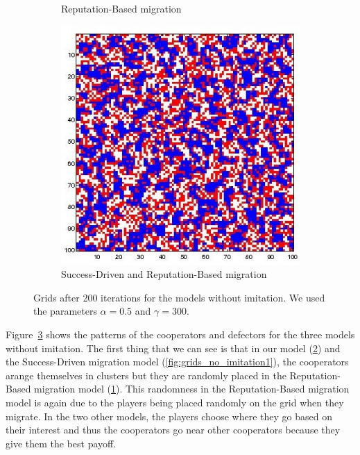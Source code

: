 \documentclass[11pt]{article}
\begin{document}
\begin{figure}[h]
\begin{subfigure}[t]{0.3\textwidth}
	\caption{Reputation-Based migration}
	\label{fig:grids_no_imitation4}
    	\end{subfigure}
	\begin{subfigure}[t]{0.3\textwidth}
        \includegraphics[width=\textwidth]{../../other/grids/m5-t200-a5-g300.jpg}
	\caption{Success-Driven and Reputation-Based migration}
	\label{fig:grids_no_imitation5}
    	\end{subfigure}

	\caption{Grids after 200 iterations for the models without imitation. We used the parameters $\alpha = 0.5$ and $\gamma = 300$.}
	\label{fig:grids_no_imitation}
\end{figure}

Figure~\ref{fig:grids_no_imitation} shows the patterns of the cooperators and defectors for the three models without imitation. The first thing that we can see is that in our model (\ref{fig:grids_no_imitation5}) and the Success-Driven migration model (\ref{fig:grids_no_imitation1}), the cooperators arange themselves in clusters but they are randomly placed in the Reputation-Based migration model (\ref{fig:grids_no_imitation4}).
This randomness in the Reputation-Based migration model is again due to the players being placed randomly on the grid when they migrate.
In the two other models, the players choose where they go based on their interest and thus the cooperators go near other cooperators because they give them the best payoff.
\end{document}
